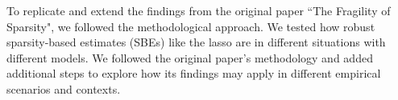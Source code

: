 
To replicate and extend the findings from the original paper ``The Fragility of Sparsity", we followed the methodological approach. We tested how robust sparsity-based estimates (SBEs) like the lasso are in different situations with different models. We followed the original paper's methodology and added additional steps to explore how its findings may apply in different empirical scenarios and contexts. 